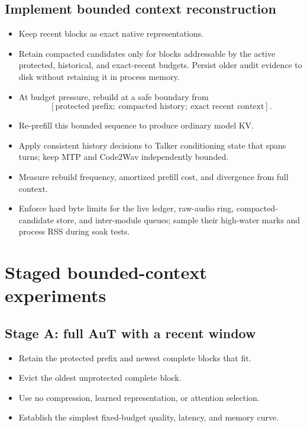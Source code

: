 \documentclass[10pt,letterpaper]{article}
\begin{document}
\subsection{Implement bounded context reconstruction}
\begin{itemize}
    \item Keep recent blocks as exact native representations.
    \item Retain compacted candidates only for blocks addressable by the active protected, historical, and exact-recent budgets. Persist older audit evidence to disk without retaining it in process memory.
    \item At budget pressure, rebuild at a safe boundary from
    \[
    [\text{protected prefix};\ \text{compacted history};\ \text{exact recent context}].
    \]
    \item Re-prefill this bounded sequence to produce ordinary model KV.
    \item Apply consistent history decisions to Talker conditioning state that spans turns; keep MTP and Code2Wav independently bounded.
    \item Measure rebuild frequency, amortized prefill cost, and divergence from full context.
    \item Enforce hard byte limits for the live ledger, raw-audio ring, compacted-candidate store, and inter-module queues; sample their high-water marks and process RSS during soak tests.
\end{itemize}

\section{Staged bounded-context experiments}

\subsection{Stage A: full AuT with a recent window}
\begin{itemize}
    \item Retain the protected prefix and newest complete blocks that fit.
    \item Evict the oldest unprotected complete block.
    \item Use no compression, learned representation, or attention selection.
    \item Establish the simplest fixed-budget quality, latency, and memory curve.
\end{itemize}
\end{document}

